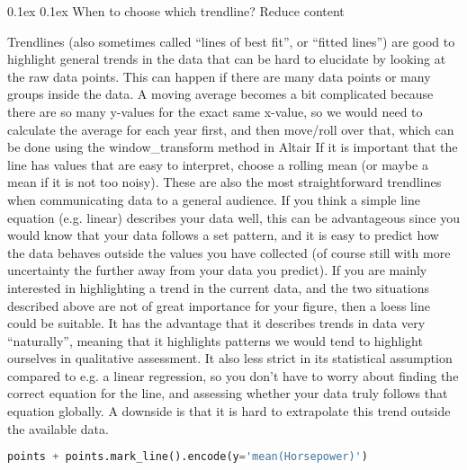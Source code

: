 \documentclass[8pt,landscape]{article}
\makeatletter
\renewcommand{\subsection}{\@startsection{subsection}{2}{0pt}%
    {0.1ex}%
    {0.1ex}%
    {\fontsize{8}{9}\bfseries\color{blue}}} %
\newcommand{\smalltext}[1]{%
  {\fontsize{8}{9}\selectfont\sloppy #1\par}%
}
\makeatother
\begin{document}
\begin{multicols}{3}
\subsection{When to choose which trendline? Reduce content }
\smalltext{
Trendlines (also sometimes called “lines of best fit”, or “fitted lines”) are good to highlight general trends in the data that can be hard to elucidate by looking at the raw data points. This can happen if there are many data points or many groups inside the data.
A moving average becomes a bit complicated because there are so many y-values for the exact same x-value, so we would need to calculate the average for each year first, and then move/roll over that, which can be done using the window\_transform method in Altair
If it is important that the line has values that are easy to interpret, choose a rolling mean (or maybe a mean if it is not too noisy). These are also the most straightforward trendlines when communicating data to a general audience.
If you think a simple line equation (e.g. linear) describes your data well, this can be advantageous since you would know that your data follows a set pattern, and it is easy to predict how the data behaves outside the values you have collected (of course still with more uncertainty the further away from your data you predict).
If you are mainly interested in highlighting a trend in the current data, and the two situations described above are not of great importance for your figure, then a loess line could be suitable. It has the advantage that it describes trends in data very “naturally”, meaning that it highlights patterns we would tend to highlight ourselves in qualitative assessment. It also less strict in its statistical assumption compared to e.g. a linear regression, so you don’t have to worry about finding the correct equation for the line, and assessing whether your data truly follows that equation globally. A downside is that it is hard to extrapolate this trend outside the available data.
}

\begin{lstlisting}[language=Python]
points + points.mark_line().encode(y='mean(Horsepower)')

\end{lstlisting}

\end{multicols}
\end{document}
